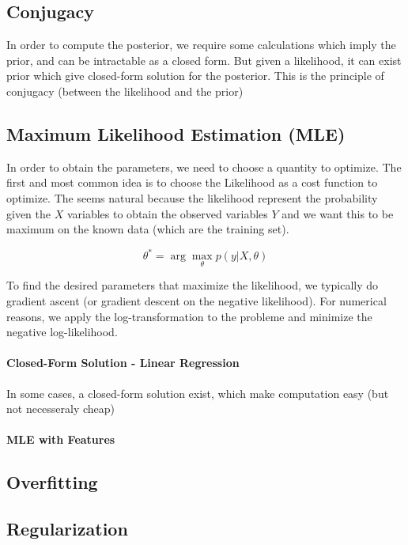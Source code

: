 	\subsection{Conjugacy} %
	\label{sub:conjugacy}
		In order to compute the posterior, we require some calculations which imply the prior, and can be intractable as a closed form. But given a likelihood, it can exist prior which give closed-form solution for the posterior. This is the principle of conjugacy (between the likelihood and the prior)

	\subsection{Maximum Likelihood Estimation (MLE)}
	In order to obtain the parameters, we need to choose a quantity to optimize. The first and most common idea is to choose the Likelihood as a cost function to optimize. The seems natural because the likelihood represent the probability given the $X$ variables to obtain the observed variables $Y$ and we want this to be maximum on the known data (which are the training set).

	\[
		\theta^* = \arg \max_{\theta} p(y | X, \theta)
	\]

	To find the desired parameters that maximize the likelihood, we typically do gradient ascent (or gradient descent on the negative likelihood). For numerical reasons, we apply the log-transformation to the probleme and minimize the negative log-likelihood. 

		\paragraph*{Closed-Form Solution - Linear Regression}

			In some cases, a closed-form solution exist, which make computation easy (but not necesseraly cheap)

		\paragraph*{MLE with Features}

	\subsection{Overfitting}

	\subsection{Regularization}
